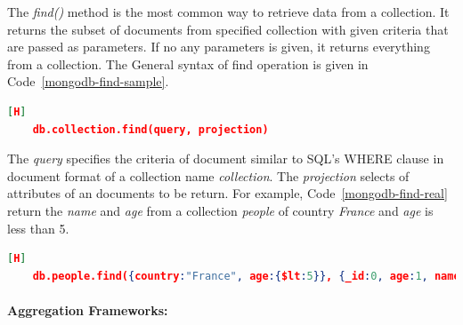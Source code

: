The \textit{find()} method is the most common way to retrieve data from a collection. It returns the subset of documents from specified collection with given criteria that are passed as parameters. If no any parameters is given, it returns everything from a collection.  The General syntax of find operation is given in Code~\ref{mongodb-find-sample}.
\begin{lstlisting}[language=JSON,caption=\textit{find} in MongoDB, label=mongodb-find-sample][H]
    db.collection.find(query, projection) 
\end{lstlisting}
 The \textit{query} specifies the criteria of document similar to SQL's WHERE clause in document format of a collection name \textit{collection}. The \textit{projection} selects of attributes of an documents to be return. For example, Code~\ref{mongodb-find-real} return the \textit{name} and \textit{age} from a collection  \textit{people} of country \textit{France} and \textit{age} is less than 5. 
\begin{lstlisting}[language=JSON,caption=\textit{find()} with query and project, label=mongodb-find-real][H]
    db.people.find({country:"France", age:{$lt:5}}, {_id:0, age:1, name:1}) 
\end{lstlisting}

\par
\paragraph{Aggregation Frameworks:}

